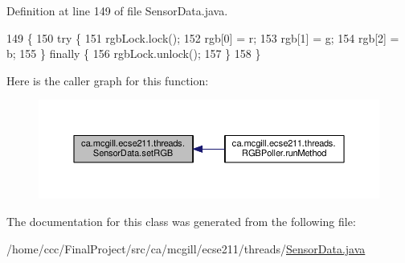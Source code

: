 Definition at line 149 of file Sensor\+Data.\+java.


\begin{DoxyCode}
149                                           \{
150     \textcolor{keywordflow}{try} \{
151       rgbLock.lock();
152       rgb[0] = r;
153       rgb[1] = g;
154       rgb[2] = b;
155     \} \textcolor{keywordflow}{finally} \{
156       rgbLock.unlock();
157     \}
158   \}
\end{DoxyCode}
Here is the caller graph for this function\+:
\nopagebreak
\begin{figure}[H]
\begin{center}
\leavevmode
\includegraphics[width=350pt]{classca_1_1mcgill_1_1ecse211_1_1threads_1_1_sensor_data_a6ad23111ecd378099f0b4ed0b6d398bc_icgraph}
\end{center}
\end{figure}


The documentation for this class was generated from the following file\+:\begin{DoxyCompactItemize}
\item 
/home/ccc/\+Final\+Project/src/ca/mcgill/ecse211/threads/\hyperlink{_sensor_data_8java}{Sensor\+Data.\+java}\end{DoxyCompactItemize}
